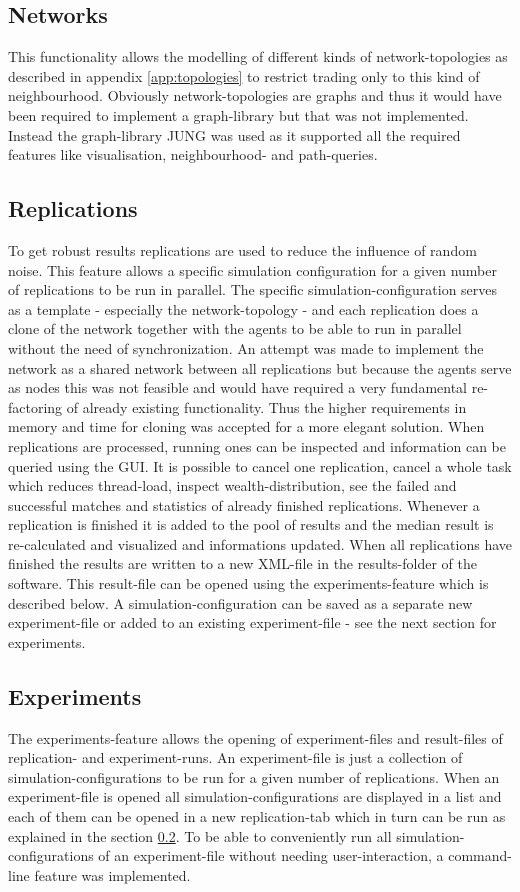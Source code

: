 \documentclass[Bachelorarbeit.tex]{subfiles}
\begin{document}
\subsection{Networks}
This functionality allows the modelling of different kinds of network-topologies as described in appendix \ref{app:topologies} to restrict trading only to this kind of neighbourhood. Obviously network-topologies are graphs and thus it would have been required to implement a graph-library but that was not implemented. Instead the graph-library JUNG was used as it supported all the required features like visualisation, neighbourhood- and path-queries.

\subsection{Replications}
\label{sec:REPLICATIONS}
To get robust results replications are used to reduce the influence of random noise. This feature allows a specific simulation configuration for a given number of replications to be run in parallel. The specific simulation-configuration serves as a template - especially the network-topology - and each replication does a clone of the network together with the agents to be able to run in parallel without the need of synchronization. An attempt was made to implement the network as a shared network between all replications but because the agents serve as nodes this was not feasible and would have required a very fundamental re-factoring of already existing functionality. Thus the higher requirements in memory and time for cloning was accepted for a more elegant solution.
When replications are processed, running ones can be inspected and information can be queried using the GUI. It is possible to cancel one replication, cancel a whole task which reduces thread-load, inspect wealth-distribution, see the failed and successful matches and statistics of already finished replications. Whenever a replication is finished it is added to the pool of results and the median result is re-calculated and visualized and informations updated. When all replications have finished the results are written to a new XML-file in the results-folder of the software. This result-file can be opened using the experiments-feature which is described below. A simulation-configuration can be saved as a separate new experiment-file or added to an existing experiment-file - see the next section for experiments.

\subsection{Experiments}
The experiments-feature allows the opening of experiment-files and result-files of replication- and experiment-runs. An experiment-file is just a collection of simulation-configurations to be run for a given number of replications. When an experiment-file is opened all simulation-configurations are displayed in a list and each of them can be opened in a new replication-tab which in turn can be run as explained in the section \ref{sec:REPLICATIONS}. To be able to conveniently run all simulation-configurations of an experiment-file without needing user-interaction, a command-line feature was implemented.
\end{document}
